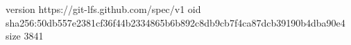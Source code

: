 version https://git-lfs.github.com/spec/v1
oid sha256:50db557e2381cf36f44b2334865b6b892c8db9cb7f4ca87dcb39190b4dba90e4
size 3841
